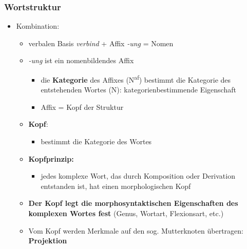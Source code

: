 \begin{frame}
\frametitle{Wortstruktur}

\begin{itemize}
	\item Kombination:
	
	\begin{itemize}
		\item verbalen Basis \emph{verbind} + Affix \emph{-ung} = Nomen
		\item \emph{-ung} ist ein nomenbildendes Affix
		
		\begin{itemize}
			\item die \textbf{Kategorie} des Affixes (N\textsuperscript{af}) bestimmt die Kategorie des entstehenden Wortes (N): kategorienbestimmende Eigenschaft
			\item[] \ras Affix = Kopf der Struktur
		\end{itemize}
		\item \textbf{Kopf}:
		
		\begin{itemize}
			\item bestimmt die Kategorie des Wortes	
		\end{itemize}
		\item \textbf{Kopfprinzip:}
		
		\begin{itemize}
			\item jedes komplexe Wort, das durch Komposition oder Derivation entstanden ist, hat einen morphologischen Kopf
		\end{itemize}
		\item \textbf{Der Kopf legt die morphosyntaktischen Eigenschaften des komplexen Wortes fest} (Genus, Wortart, Flexionsart, etc.)
		\item Vom Kopf werden Merkmale auf den sog. Mutterknoten übertragen: \textbf{Projektion}
	\end{itemize}
\end{itemize}


\end{frame}


